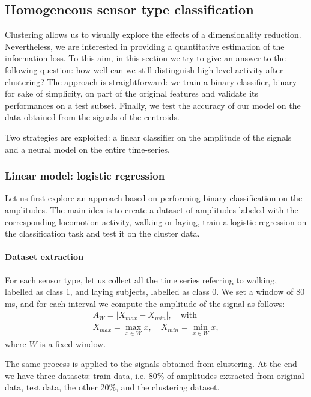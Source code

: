 \documentclass[10pt, a4paper, twocolumn]{article}
\theoremstyle{definition}
\begin{document}
\subsection{Homogeneous sensor type classification}\label{sec:homo}
Clustering allows us to visually explore the effects of a dimensionality reduction. Nevertheless, we are interested in providing a quantitative estimation of the information loss. To this aim, in this section we try to give an answer to the following question: how well can we still distinguish high level activity after clustering? The approach is straightforward: we train a binary classifier, binary for sake of simplicity, on part of the original features and validate its performances on a test subset. Finally, we test the accuracy of our model on the data obtained from the signals of the centroids. \par
Two strategies are exploited: a linear classifier on the amplitude of the signals and a neural model on the entire time-series.

\subsubsection{Linear model: logistic regression}
Let us first explore an approach based on performing binary classification on the amplitudes. The main idea is to create a dataset of amplitudes labeled with the corresponding locomotion activity, walking or laying, train a logistic regression on the classification task and test it on the cluster data. 

\paragraph{Dataset extraction} For each sensor type, let us collect all the time series referring to walking, labelled as class 1, and laying subjects, labelled as class 0. We set a window of 80 ms, and for each interval we compute the amplitude of the signal as follows:
\begin{equation}\begin{split}
A_W= |{X_{max}-X_{min}}|, \quad \text{with} \\ X_{max}=\max_{x\in W }x, \quad X_{min}=\min_{x\in W }x,
\end{split}\end{equation}
where $W$ is a fixed window. \par
The same process is applied to the signals obtained from clustering. At the end we have three datasets: train data, i.e. 80\% of amplitudes extracted from original data,  test data, the other 20\%, and the clustering dataset.
\end{document}
